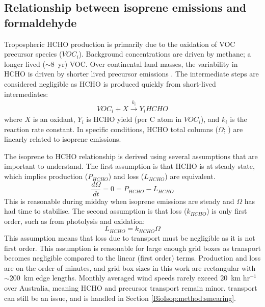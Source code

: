     
  \subsection{Relationship between isoprene emissions and formaldehyde}
    \label{BioIsop:method:slope}
    
    
    Tropospheric HCHO production is primarily due to the oxidation of VOC precursor species ($VOC_i$).
    Background concentrations are driven by methane; a longer lived ($\sim 8$~yr) VOC.
    Over continental land masses, the variability in HCHO is driven by shorter lived precursor emissions \parencite{Chance2000,Palmer2003}.
    The intermediate steps are considered negligible as HCHO is produced quickly from short-lived intermediates:
    \begin{eqnarray*}
      VOC_i + X \overset{k_i}{\rightarrow} Y_i HCHO
    \end{eqnarray*}
    where $X$ is an oxidant, $Y_i$ is HCHO yield (per C atom in $VOC_i$), and $k_i$ is the reaction rate constant.
    In specific conditions, HCHO total columns ($\Omega$; \moleccm) are linearly related to isoprene emissions.
    
    The isoprene to HCHO relationship is derived using several assumptions that are important to understand.
    The first assumption is that HCHO is at steady state, which implies production ($P_{HCHO}$) and loss ($L_{HCHO}$) are equivalent.
    \begin{equation}
      \label{BioIsop:method:slope:eqn_steady_state]}
      \frac{d \Omega }{dt} = 0 = P_{HCHO} - L_{HCHO}
    \end{equation}
    This is reasonable during midday when isoprene emissions are steady and $\Omega$ has had time to stabilise.
    The second assumption is that loss ($k_{HCHO}$) is only first order, such as from photolysis and oxidation:
    \begin{equation}
      \label{BioIsop:method:slope:eqn_loss}
      L_{HCHO}  = k_{HCHO} \Omega %
    \end{equation}
    This assumption means that loss due to transport must be negligible as it is not first order.
    This assumption is reasonable for large enough grid boxes as transport becomes negligible compared to the linear (first order) terms.
    Production and loss are on the order of minutes, and grid box sizes in this work are rectangular with $\sim 200$~km edge lengths.
    Monthly averaged wind speeds rarely exceed 20~km hr$^{-1}$ over Australia, meaning HCHO and precursor transport remain minor.
    transport can still be an issue, and is handled in Section \ref{BioIsop:method:smearing}.
    
